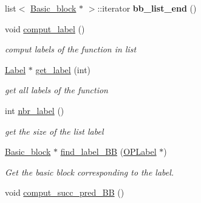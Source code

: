 \begin{DoxyCompactItemize}
\item 
\hypertarget{class_function_a06be1b0a730b4ead3da6bb5529df9788}{list$<$ \hyperlink{class_basic__block}{Basic\+\_\+block} $\ast$ $>$\+::iterator {\bfseries bb\+\_\+list\+\_\+end} ()}\label{class_function_a06be1b0a730b4ead3da6bb5529df9788}

\item 
\hypertarget{class_function_a1c8830219ce4306c22a933b17f54cc6f}{void \hyperlink{class_function_a1c8830219ce4306c22a933b17f54cc6f}{comput\+\_\+label} ()}\label{class_function_a1c8830219ce4306c22a933b17f54cc6f}

\begin{DoxyCompactList}\small\item\em comput labels of the function in list \end{DoxyCompactList}\item 
\hypertarget{class_function_a4b2e9837c4b506b3c7a6d1488d9914d1}{\hyperlink{class_label}{Label} $\ast$ \hyperlink{class_function_a4b2e9837c4b506b3c7a6d1488d9914d1}{get\+\_\+label} (int)}\label{class_function_a4b2e9837c4b506b3c7a6d1488d9914d1}

\begin{DoxyCompactList}\small\item\em get all labels of the function \end{DoxyCompactList}\item 
\hypertarget{class_function_a3f3807e12e695ffe23e1ef44edcd262b}{int \hyperlink{class_function_a3f3807e12e695ffe23e1ef44edcd262b}{nbr\+\_\+label} ()}\label{class_function_a3f3807e12e695ffe23e1ef44edcd262b}

\begin{DoxyCompactList}\small\item\em get the size of the list label \end{DoxyCompactList}\item 
\hypertarget{class_function_ae55c0232d0eced8830daf57293229db8}{\hyperlink{class_basic__block}{Basic\+\_\+block} $\ast$ \hyperlink{class_function_ae55c0232d0eced8830daf57293229db8}{find\+\_\+label\+\_\+\+B\+B} (\hyperlink{class_o_p_label}{O\+P\+Label} $\ast$)}\label{class_function_ae55c0232d0eced8830daf57293229db8}

\begin{DoxyCompactList}\small\item\em Get the basic block corresponding to the label. \end{DoxyCompactList}\item 
\hypertarget{class_function_a3c52c8cb82e0137f02771331018b655c}{void \hyperlink{class_function_a3c52c8cb82e0137f02771331018b655c}{comput\+\_\+succ\+\_\+pred\+\_\+\+B\+B} ()}\label{class_function_a3c52c8cb82e0137f02771331018b655c}


\end{DoxyCompactItemize}
